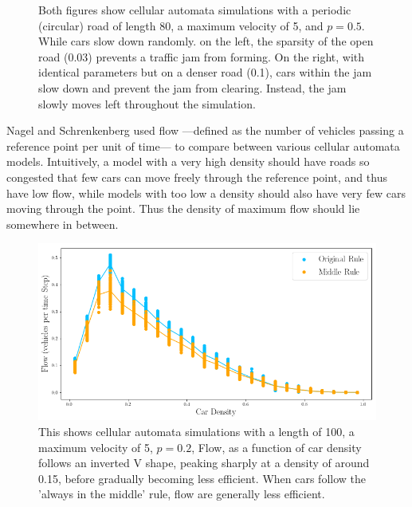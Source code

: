 \documentclass{article}
\begin{document}
\begin{figure}[h]
\begin{minipage}[t]{.5\textwidth}
\end{minipage}

\caption{Both figures show cellular automata simulations with a periodic (circular) road of length 80, a maximum velocity of 5, and $p = 0.5$. While cars slow down randomly. on the left, the sparsity of the open road (0.03) prevents a traffic jam from forming. On the right, with identical parameters but on a denser road (0.1), cars within the jam slow down and prevent the jam from clearing. Instead, the jam slowly moves left throughout the simulation.}
\end{figure}

Nagel and Schrenkenberg used flow ---defined as the number of vehicles passing a reference point per unit of time--- to compare between various cellular automata models. Intuitively, a model with a very high density should have roads so congested that few cars can move freely through the reference point, and thus have low flow, while models with too low a density should also have very few cars moving through the point. Thus the density of maximum flow should lie somewhere in between.

\begin{figure}
\centering
\includegraphics[scale = 0.6]{middleorig.png}
\caption{This shows cellular automata simulations with a length of 100, a maximum velocity of 5, $p = 0.2$, Flow, as a function of car density follows an inverted V shape, peaking sharply at a density of around 0.15, before gradually becoming less efficient. When cars follow the 'always in the middle' rule, flow are generally less efficient.}
\end{figure}

\end{document}

